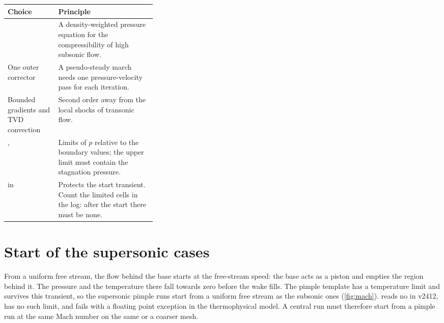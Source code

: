 \begin{tabularx}{\linewidth}{@{}P{0.34\linewidth} L@{}}
\toprule
Choice & Principle \\
\midrule
{} & A density-weighted pressure equation for the compressibility of high subsonic flow. \\
One outer corrector & A pseudo-steady march needs one pressure-velocity pass for each iteration. \\
Bounded gradients and TVD convection & Second order away from the local shocks of transonic flow. \\
,  & Limits of $p$ relative to the boundary values; the upper limit must contain the stagnation pressure. \\
 in  & Protects the start transient. Count the limited cells in the log: after the start there must be none. \\
\bottomrule
\end{tabularx}

\section{Start of the supersonic cases}\label{sec:supersonic-start}

From a uniform free stream, the flow behind the base starts at the free-stream speed:
the base acts as a piston and empties the region behind it. The pressure and the
temperature there fall towards zero before the wake fills. The pimple template has a
temperature limit and survives this transient, so the supersonic pimple runs start
from a uniform free stream as the subsonic ones (\cref{fig:mach}). 
reads no  in v2412, has no such limit, and fails with a floating point
exception in the thermophysical model. A central run must therefore start from a pimple
run at the same Mach number on the same or a coarser mesh.
